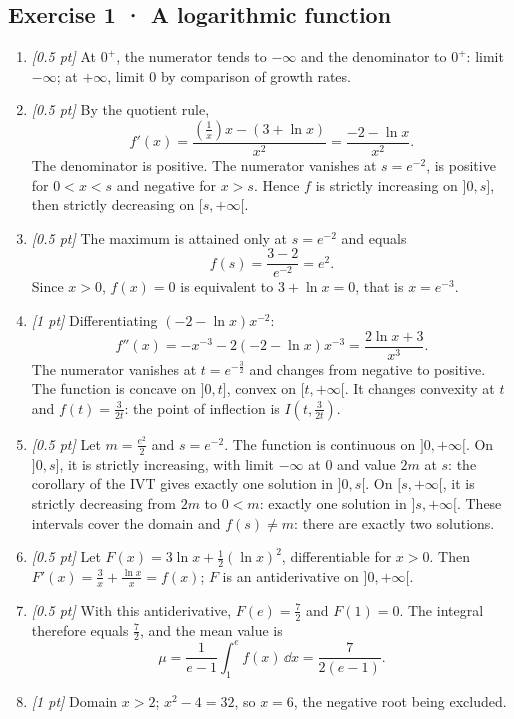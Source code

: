 \subsection*{Exercise 1 · A logarithmic function}\begin{enumerate}

\item \textit{[0.5 pt]} At $0^+$, the numerator tends to $-\infty$ and the denominator to $0^+$: limit $-\infty$; at $+\infty$, limit $0$ by comparison of growth rates.

\item \textit{[0.5 pt]} By the quotient rule,
\[f'(x)=\frac{(\frac{1}{x})x-(3+\ln x)}{x^2}=\frac{-2-\ln x}{x^2}.\]
The denominator is positive. The numerator vanishes at $s=e^{-2}$, is positive for $0<x<s$ and negative for $x>s$. Hence $f$ is strictly increasing on $]0,s]$, then strictly decreasing on $[s,+\infty[$.

\item \textit{[0.5 pt]} The maximum is attained only at $s=e^{-2}$ and equals
\[f(s)=\frac{3- 2}{e^{-2}}=e^{2}.\]
Since $x>0$, $f(x)=0$ is equivalent to $3+\ln x=0$, that is $x=e^{-3}$.

\item \textit{[1 pt]} Differentiating $(-2-\ln x)x^{-2}$:
\[f''(x)=-x^{-3}-2(-2-\ln x)x^{-3}=\frac{2\ln x+3}{x^3}.\]
The numerator vanishes at $t=e^{-\frac{3}{2}}$ and changes from negative to positive. The function is concave on $]0,t]$, convex on $[t,+\infty[$. It changes convexity at $t$ and $f(t)=\frac{3}{2t}$: the point of inflection is $I(t,\frac{3}{2t})$.

\item \textit{[0.5 pt]} Let $m=\frac{e^{2}}{2}$ and $s=e^{-2}$. The function is continuous on $]0,+\infty[$. On $]0,s]$, it is strictly increasing, with limit $-\infty$ at $0$ and value $2m$ at $s$: the corollary of the IVT gives exactly one solution in $]0,s[$. On $[s,+\infty[$, it is strictly decreasing from $2m$ to $0<m$: exactly one solution in $]s,+\infty[$. These intervals cover the domain and $f(s)\ne m$: there are exactly two solutions.

\item \textit{[0.5 pt]} Let $F(x)=3\ln x+\frac12(\ln x)^2$, differentiable for $x>0$. Then $F'(x)=\frac{3}{x}+\frac{\ln x}{x}=f(x)$; $F$ is an antiderivative on $]0,+\infty[$.

\item \textit{[0.5 pt]} With this antiderivative, $F(e)=\frac{7}{2}$ and $F(1)=0$. The integral therefore equals $\frac{7}{2}$, and the mean value is
\[\mu=\frac{1}{e-1}\int_1^e f(x)\,\dd x=\frac{7}{2(e-1)}.\]

\item \textit{[1 pt]} Domain $x>2$; $x^2-4=32$, so $x=6$, the negative root being excluded.

\end{enumerate}

